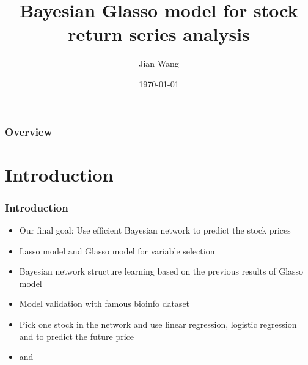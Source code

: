 \documentclass{beamer}
\title[Bayesian-Glasso Model]{Bayesian Glasso model for stock return series analysis} %
\author{Jian Wang } %
\institute[Florida state university ] %
{Financial math Ph.D. candidate\\
\vspace{3ex}
Florida state university %
\medskip
\textit{jwang@math.fsu.edu} %
}
\date{\today} %
\begin{document}
\begin{frame}
\titlepage %
\end{frame}

\begin{frame}
\frametitle{Overview} %
\tableofcontents %
\end{frame}


\section{Introduction} %


\begin{frame}
\frametitle{Introduction}
\begin{itemize}
\item Our final goal: Use efficient {\color{red}Bayesian} network to predict the stock prices
\item {\color{red}Lasso} model and {\color{red}Glasso} model for variable selection
\item Bayesian network structure learning based on the previous results of Glasso model
\item Model validation with famous bioinfo dataset
\item Pick one stock in the network and use {\color{red}linear regression},{\color{red} logistic regression} and {\color{red}{support vector machine}} to predict the future price
\item {\color{red}{Parallel computing}} and {\color{red}{high frequency data}}
\end{itemize}


\end{frame}
\end{document}
